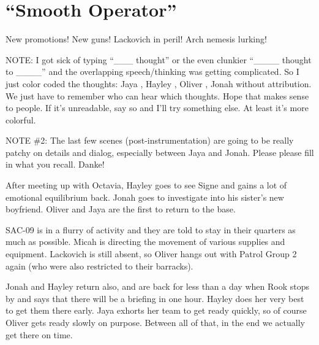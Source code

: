 \setcounter{chapter}{ 19 }
\chapter{\textbf{``Smooth Operator''} }








New promotions!  New guns!  Lackovich in peril!  Arch nemesis lurking!



NOTE: I got sick of typing ``\_\_\_ thought'' or the even clunkier ``\_\_\_\_ thought to \_\_\_\_'' and the overlapping speech/thinking was getting complicated.  So I just color coded the thoughts:  {\color[RGB]{204,0,0}Jaya} ,  {\color[RGB]{230,145,56}Hayley} ,  {\color[RGB]{106,168,79}Oliver} ,  {\color[RGB]{60,120,216}Jonah}  without attribution.  We just have to remember who can hear which thoughts.  Hope that makes sense to people.  If it's unreadable, say so and I'll try something else.  At least it's more colorful.



NOTE \#2: The last few scenes (post-instrumentation) are going to be really patchy on details and dialog, especially between Jaya and Jonah.  Please please fill in what you recall.  Danke!





After meeting up with Octavia, Hayley goes to see Signe and gains a lot of emotional equilibrium back.  Jonah goes to investigate into his sister's new boyfriend.  Oliver and Jaya are the first to return to the base.



SAC-09 is in a flurry of activity and they are told to stay in their quarters as much as possible.  Micah is directing the movement of various supplies and equipment.  Lackovich is still absent, so Oliver hangs out with Patrol Group 2 again (who were also restricted to their barracks).



Jonah and Hayley return also, and are back for less than a day when Rook stops by and says that there will be a briefing in one hour.  Hayley does her very best to get them there early.   Jaya exhorts her team to get ready quickly, so of course Oliver gets ready slowly on purpose.   Between all of that, in the end we actually get there on time.



